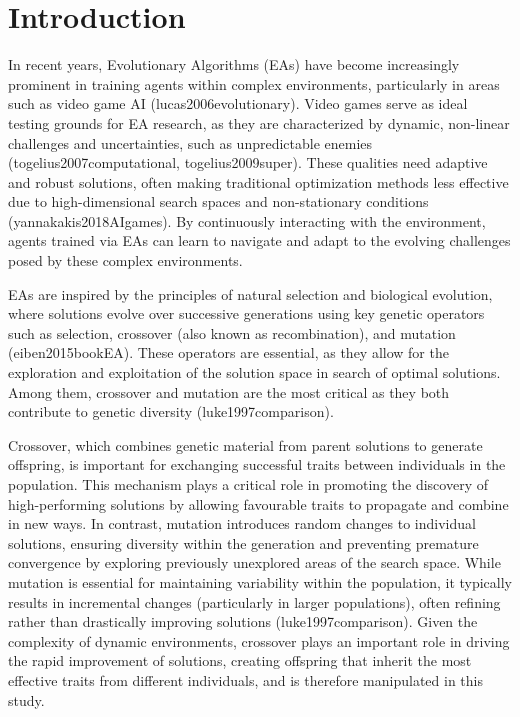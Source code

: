 
\section{Introduction}\label{sec:introduction}
In recent years, Evolutionary Algorithms (EAs) have become increasingly prominent in training agents within complex environments, particularly in areas such as video game AI (lucas2006evolutionary).
Video games serve as ideal testing grounds for EA research, as they are characterized by dynamic, non-linear challenges and uncertainties, such as unpredictable enemies (togelius2007computational, togelius2009super).
These qualities need adaptive and robust solutions, often making traditional optimization methods less effective due to high-dimensional search spaces and non-stationary conditions (yannakakis2018AIgames).
By continuously interacting with the environment, agents trained via EAs can learn to navigate and adapt to the evolving challenges posed by these complex environments.

EAs are inspired by the principles of natural selection and biological evolution, where solutions evolve over successive generations using key genetic operators such as selection, crossover (also known as recombination), and mutation (eiben2015bookEA).
These operators are essential, as they allow for the exploration and exploitation of the solution space in search of optimal solutions.
Among them, crossover and mutation are the most critical as they both contribute to genetic diversity (luke1997comparison). 

Crossover, which combines genetic material from parent solutions to generate offspring, is important for exchanging successful traits between individuals in the population.
This mechanism plays a critical role in promoting the discovery of high-performing solutions by allowing favourable traits to propagate and combine in new ways.
In contrast, mutation introduces random changes to individual solutions, ensuring diversity within the generation and preventing premature convergence by exploring previously unexplored areas of the search space.
While mutation is essential for maintaining variability within the population, it typically results in incremental changes (particularly in larger populations), often refining rather than drastically improving solutions (luke1997comparison).
Given the complexity of dynamic environments, crossover plays an important role in driving the rapid improvement of solutions, creating offspring that inherit the most effective traits from different individuals, and is therefore manipulated in this study.

